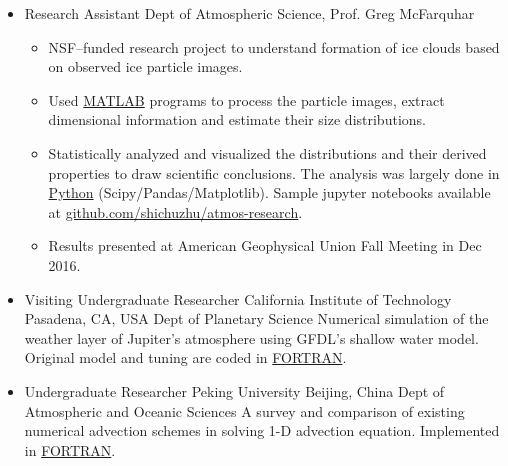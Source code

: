 \documentclass[11pt,a4paper,sans]{moderncv}        %
\begin{document}
\begin{itemize}
	\item{
	      {Research Assistant}
	      {\vspace{-10pt}}
	      {}
	      {Dept of Atmospheric Science, Prof. Greg McFarquhar}
	      {
		      \begin{itemize}
			      \item 
			            NSF--funded research project to understand formation of ice clouds based on observed ice particle images.
			      \item Used \underline{MATLAB} programs to process the particle images, extract dimensional information and estimate their size distributions.
			      \item Statistically analyzed and visualized the distributions and their derived properties to draw scientific conclusions. The analysis was largely done in \underline{Python} (Scipy/Pandas/Matplotlib). Sample jupyter notebooks available at \href{https://github.com/shichuzhu/atmos-research}{\underline{github.com/shichuzhu/atmos-research}}.
			      \item Results presented at American Geophysical Union Fall Meeting in Dec 2016.
		      \end{itemize}
	      }
	      }
	      
	\item{
	      {Visiting Undergraduate Researcher}
	      {California Institute of Technology}
	      {Pasadena, CA, USA}
	      {Dept of Planetary Science}
	      {Numerical simulation of the weather layer of Jupiter's atmosphere using GFDL's shallow water model. Original model and tuning are coded in \underline{FORTRAN}.}
	      }
	      
	\item{
	      {Undergraduate Researcher}
	      {Peking University}
	      {Beijing, China}
	      {Dept of Atmospheric and Oceanic Sciences}
	      {A survey and comparison of existing numerical advection schemes in solving 1-D advection equation. Implemented in \underline{FORTRAN}.}
	      }
	      
\end{itemize}

\vspace{-5pt}
\end{document}
